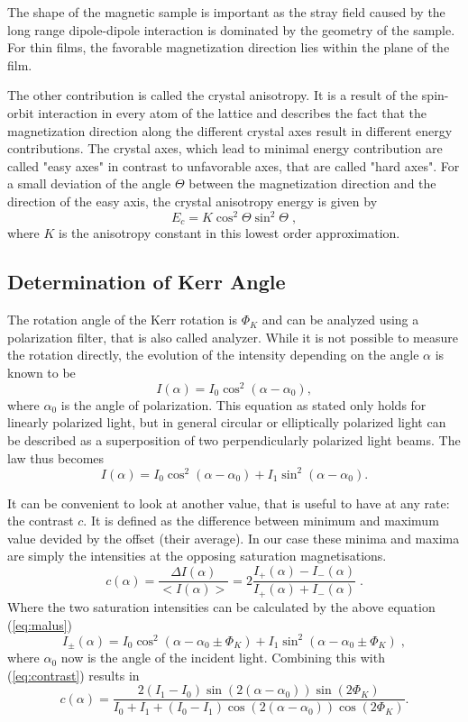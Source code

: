 \documentclass[a4paper]{scrartcl}
\numberwithin{equation}{section}
\numberwithin{figure}{section}
\numberwithin{table}{section}
\newcommand{\eq}[2]{\begin{equation}#1\label{#2}\end{equation}}
\newcommand{\Formel}[1]{(\ref{#1})}
\begin{document}
The shape of the magnetic sample is important as the stray field caused by the long range dipole-dipole interaction is dominated by the geometry of the sample. For thin films, the favorable magnetization direction lies within the plane of the film.

The other contribution is called the crystal anisotropy. It is a result of the spin-orbit interaction in every atom of the lattice and describes the fact that the magnetization direction along the different crystal axes result in different energy contributions. The crystal axes, which lead to minimal energy contribution are called "easy axes" in contrast to unfavorable axes, that are called "hard axes". For a small deviation of the angle $\Theta$ between the magnetization direction and the direction of the easy axis, the crystal anisotropy energy is given by
\eq{E_c=K \cos^2 \Theta \sin^2 \Theta \; , }{eq:aniso}
where $K$ is the anisotropy constant in this lowest order approximation.


\subsection{Determination of Kerr Angle}
The rotation angle of the Kerr rotation is $\Phi_K$ and can be analyzed using a polarization filter, that is also called analyzer. While it is not possible to measure the rotation directly, the evolution of the intensity depending on the angle $\alpha$ is known to be
\eq{I(\alpha)=I_0 \cos^2(\alpha-\alpha_0) ,}{eq:malus}
where $\alpha_0$ is the angle of polarization. This equation as stated only holds for linearly polarized light, but in general circular or elliptically polarized light can be described as a superposition of two perpendicularly polarized light beams. The law thus becomes
\eq{I(\alpha) = I_0 \cos^2(\alpha-\alpha_0) + I_1 \sin^2(\alpha-\alpha_0) .}{}

It can be convenient to look at another value, that is useful to have at any rate: the contrast $c$. It is defined as the difference between minimum and maximum value devided by the offset (their average). In our case these minima and maxima are simply the intensities at the opposing saturation magnetisations.
\eq{c(\alpha)=\frac{\Delta I(\alpha)}{<I(\alpha)>} = 2\frac{I_+(\alpha)-I_-(\alpha)}{I_+(\alpha)+I_-(\alpha)} \; .}{eq:contrast}
Where the two saturation intensities can be calculated by the above equation \Formel{eq:malus}
\eq{I_\pm(\alpha) = I_0 \cos^2(\alpha-\alpha_0\pm\Phi_K) + I_1 \sin^2(\alpha-\alpha_0\pm\Phi_K) \; ,}{}
where $\alpha_0$ now is the angle of the incident light. Combining this with \Formel{eq:contrast} results in
\eq{c(\alpha) = \frac{2(I_1-I_0) \sin(2(\alpha-\alpha_0)) \sin(2\Phi_K) } { I_0+I_1+ (I_0-I_1)\cos(2(\alpha-\alpha_0)) \cos(2\Phi_K)} .}{eq:c}
\end{document}
